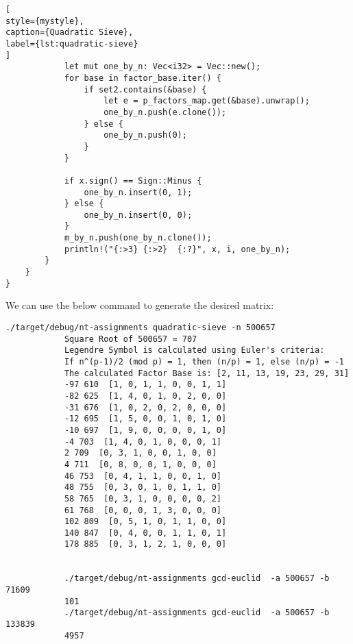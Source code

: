 \documentclass[11pt,a4paper,fleqn]{article}
\begin{document}
\begin{enumerate}[1.]
\begin{flushleft}
\begin{enumerate}[Step 1.]
\begin{lstlisting}[
style={mystyle},
caption={Quadratic Sieve},
label={lst:quadratic-sieve}
]
            let mut one_by_n: Vec<i32> = Vec::new();
            for base in factor_base.iter() {
                if set2.contains(&base) {
                    let e = p_factors_map.get(&base).unwrap();
                    one_by_n.push(e.clone());
                } else {
                    one_by_n.push(0);
                }
            }

            if x.sign() == Sign::Minus {
                one_by_n.insert(0, 1);
            } else {
                one_by_n.insert(0, 0);
            }
            m_by_n.push(one_by_n.clone());
            println!("{:>3} {:>2}  {:?}", x, i, one_by_n);
        }
    }
}
                \end{lstlisting}

                \bigbreak
                We can use the below command to generate the desired matrix:
                \begin{lstlisting}[style=DOS, caption=Quadratic Sieve Matrix Generation]
            ./target/debug/nt-assignments quadratic-sieve -n 500657
            Square Root of 500657 = 707
            Legendre Symbol is calculated using Euler's criteria:
            If n^(p-1)/2 (mod p) = 1, then (n/p) = 1, else (n/p) = -1
            The calculated Factor Base is: [2, 11, 13, 19, 23, 29, 31]
            -97 610  [1, 0, 1, 1, 0, 0, 1, 1]
            -82 625  [1, 4, 0, 1, 0, 2, 0, 0]
            -31 676  [1, 0, 2, 0, 2, 0, 0, 0]
            -12 695  [1, 5, 0, 0, 1, 0, 1, 0]
            -10 697  [1, 9, 0, 0, 0, 0, 1, 0]
            -4 703  [1, 4, 0, 1, 0, 0, 0, 1]
            2 709  [0, 3, 1, 0, 0, 1, 0, 0]
            4 711  [0, 8, 0, 0, 1, 0, 0, 0]
            46 753  [0, 4, 1, 1, 0, 0, 1, 0]
            48 755  [0, 3, 0, 1, 0, 1, 1, 0]
            58 765  [0, 3, 1, 0, 0, 0, 0, 2]
            61 768  [0, 0, 0, 1, 3, 0, 0, 0]
            102 809  [0, 5, 1, 0, 1, 1, 0, 0]
            140 847  [0, 4, 0, 0, 1, 1, 0, 1]
            178 885  [0, 3, 1, 2, 1, 0, 0, 0]


            ./target/debug/nt-assignments gcd-euclid  -a 500657 -b 71609
            101
            ./target/debug/nt-assignments gcd-euclid  -a 500657 -b 133839
            4957
                \end{lstlisting}
            \end{enumerate}
		\end{flushleft}


\end{enumerate}
\end{document}
